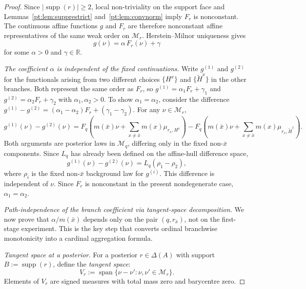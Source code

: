 \documentclass[11pt,a4paper]{article}
\theoremstyle{definition}
\newcommand{\R}{\mathbb R}
\newcommand{\1}{\mathbf 1}
\begin{document}
\begin{proof}
Since $|\operatorname{supp}(r)|\ge2$, local non-triviality on the support face and Lemmas~\ref{pt:lem:supprestrict} and~\ref{pt:lem:convnorm} imply $F_r$ is nonconstant.  The continuous affine functions $g$ and $F_r$ are therefore nonconstant
affine representatives of the same weak order on $\mathcal M_r$.  Herstein--Milnor uniqueness gives
\[
g(\nu)=\alpha\,F_r(\nu)+\gamma
\]
for some $\alpha>0$ and $\gamma\in\R$.

\emph{The coefficient $\alpha$ is independent of the fixed continuations.}  Write $g^{(1)}$ and $g^{(2)}$ for the
functionals arising from two different choices $\{H^x\}$ and $\{\widetilde H^x\}$ in the other branches.  Both
represent the same order as $F_r$, so $g^{(1)}=\alpha_1 F_r+\gamma_1$ and
$g^{(2)}=\alpha_2 F_r+\gamma_2$ with $\alpha_1,\alpha_2>0$.  To show $\alpha_1=\alpha_2$, consider the
difference $g^{(1)}-g^{(2)}=(\alpha_1-\alpha_2)F_r+(\gamma_1-\gamma_2)$.  For any
$\nu\in\mathcal M_r$,
\[
g^{(1)}(\nu)-g^{(2)}(\nu)
=
F_q\!\left(m(\bar x)\nu+\textstyle\sum_{x\ne\bar x}m(x)\mu_{r_x,H^x}\right)
-
F_q\!\left(m(\bar x)\nu+\textstyle\sum_{x\ne\bar x}m(x)\mu_{r_x,\widetilde H^x}\right).
\]
Both arguments are posterior laws in $\mathcal M_q$, differing only in the fixed non-$\bar x$ components.  Since $L_q$
has already been defined on the affine-hull difference space,
\[
g^{(1)}(\nu)-g^{(2)}(\nu)=L_q(\rho_1-\rho_2),
\]
where $\rho_i$ is the fixed non-$\bar x$ background law for $g^{(i)}$.  This difference is independent of $\nu$.  Since
$F_r$ is nonconstant in the present nondegenerate case, $\alpha_1=\alpha_2$.

\emph{Path-independence of the branch coefficient via tangent-space decomposition.}
We now prove that $\alpha/m(\bar x)$ depends only on the pair $(q,r_{\bar x})$, not on the first-stage experiment.
This is the key step that converts ordinal branchwise monotonicity into a cardinal aggregation formula.

\emph{Tangent space at a posterior.}  For a posterior $r\in\Delta(A)$ with support $B:=\operatorname{supp}(r)$, define
the \emph{tangent space}:
\[
V_r:=\operatorname{span}\{\nu-\nu':\nu,\nu'\in\mathcal M_r\}.
\]
Elements of $V_r$ are signed measures with total mass zero and barycentre zero.


\end{proof}
\end{document}
